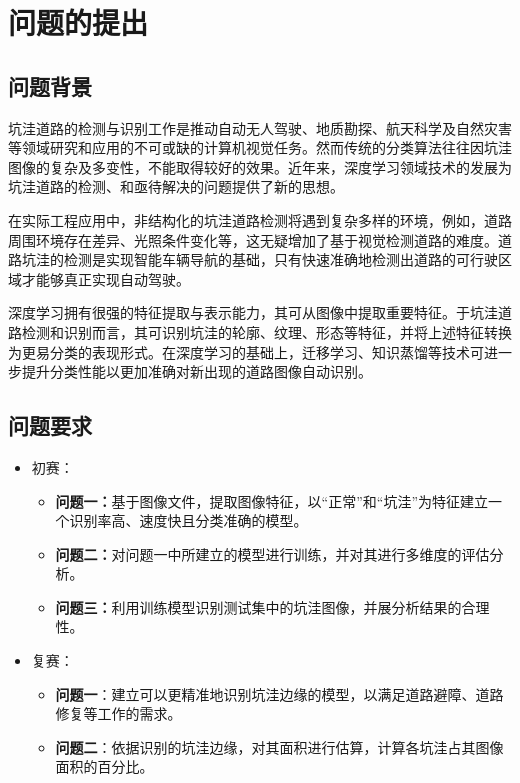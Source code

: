 \documentclass{MathorCupmodeling}
\begin{document}
	\pagestyle{empty}
	\tableofcontents
	\newpage
	\pagestyle{fancy}

	\setcounter{page}{1}
	\section{问题的提出}
	\subsection{问题背景}
	坑洼道路的检测与识别工作是推动自动无人驾驶、地质勘探、航天科学及自然灾害等领域研究和应用的不可或缺的计算机视觉任务。然而传统的分类算法往往因坑洼图像的复杂及多变性，不能取得较好的效果。近年来，深度学习领域技术的发展为坑洼道路的检测、和亟待解决的问题提供了新的思想。

	在实际工程应用中，非结构化的坑洼道路检测将遇到复杂多样的环境，例如，道路周围环境存在差异、光照条件变化等，这无疑增加了基于视觉检测道路的难度\textcolor{blue}{\cite{曹江华}}。道路坑洼的检测是实现智能车辆导航的基础，只有快速准确地检测出道路的可行驶区域才能够真正实现自动驾驶。

	深度学习拥有很强的特征提取与表示能力，其可从图像中提取重要特征。于坑洼道路检测和识别而言，其可识别坑洼的轮廓、纹理、形态等特征，并将上述特征转换为更易分类的表现形式。在深度学习的基础上，迁移学习、知识蒸馏等技术可进一步提升分类性能以更加准确对新出现的道路图像自动识别。
	\subsection{问题要求}
	\begin{itemize}
		\item {\heiti 初赛：}
		\begin{itemize}
			\item \textbf{问题一：}基于图像文件，提取图像特征，以“正常”和“坑洼”为特征建立一个识别率高、速度快且分类准确的模型。
			\item \textbf{问题二：}对问题一中所建立的模型进行训练，并对其进行多维度的评估分析。
			\item \textbf{问题三：}利用训练模型识别测试集中的坑洼图像，并展分析结果的合理性。
		\end{itemize}
		\item {\heiti 复赛：}
		\begin{itemize}
			\item \textbf{问题一}：建立可以更精准地识别坑洼边缘的模型，以满足道路避障、道路修复等工作的需求。
			\item \textbf{问题二}：依据识别的坑洼边缘，对其面积进行估算，计算各坑洼占其图像面积的百分比。
		\end{itemize}
	\end{itemize}
\end{document}
